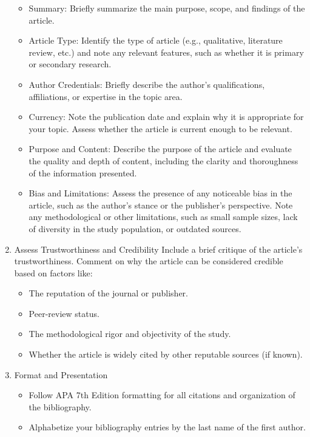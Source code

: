 \documentclass[
  letterpaper,
  DIV=11,
  numbers=noendperiod]{scrreprt}
\providecommand{\tightlist}{%
  \setlength{\itemsep}{0pt}\setlength{\parskip}{0pt}}\usepackage{longtable,booktabs,array}
\begin{document}
\begin{enumerate}
  \begin{itemize}
  \tightlist
  \item
    Summary: Briefly summarize the main purpose, scope, and findings of
    the article.
  \item
    Article Type: Identify the type of article (e.g., qualitative,
    literature review, etc.) and note any relevant features, such as
    whether it is primary or secondary research.
  \item
    Author Credentials: Briefly describe the author's qualifications,
    affiliations, or expertise in the topic area.
  \item
    Currency: Note the publication date and explain why it is
    appropriate for your topic. Assess whether the article is current
    enough to be relevant.
  \item
    Purpose and Content: Describe the purpose of the article and
    evaluate the quality and depth of content, including the clarity and
    thoroughness of the information presented.
  \item
    Bias and Limitations: Assess the presence of any noticeable bias in
    the article, such as the author's stance or the publisher's
    perspective. Note any methodological or other limitations, such as
    small sample sizes, lack of diversity in the study population, or
    outdated sources.
  \end{itemize}
\item
  Assess Trustworthiness and Credibility Include a brief critique of the
  article's trustworthiness. Comment on why the article can be
  considered credible based on factors like:

  \begin{itemize}
  \tightlist
  \item
    The reputation of the journal or publisher.
  \item
    Peer-review status.
  \item
    The methodological rigor and objectivity of the study.
  \item
    Whether the article is widely cited by other reputable sources (if
    known).
  \end{itemize}
\item
  Format and Presentation

  \begin{itemize}
  \tightlist
  \item
    Follow APA 7th Edition formatting for all citations and organization
    of the bibliography.
  \item
    Alphabetize your bibliography entries by the last name of the first
    author.
  \end{itemize}
\end{enumerate}
\end{document}
